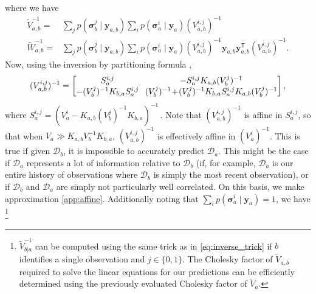 \documentclass{article} %
\newcommand{\deq}{=}
\newcommand{\given}{\!\ensuremath{\mid}\!}
\newcommand{\cm}[1]{\ensuremath{\mathcal{#1}}}
\newcommand{\bm}[1]{\ensuremath{\mathbf{#1}}}
\newcommand{\data}{\ensuremath{\cm{D}}}
\newcommand{\vect}[1]{\bm{#1}}
\newcommand{\vy}{\vect{y}}
\newcommand{\vs}{\vect{\sigma}}
\newcommand{\amean}[2]{\tilde{{m}}(#1 \given #2 )}
\newcommand{\acov}[2]{\tilde{{C}}(#1 \given #2 )}
\newcommand{\fPr}{p}
\newcommand{\Prob}[2]{\fPr(#1 \given #2 )}
\newcommand{\st}{_{\star}}
\newcommand{\tr}{\ensuremath{\mathsf{T}}}
\begin{document}
where we have
\begin{align*}
\tilde{V}^{-1}_{a,b} \deq {} &
\sum_{j} \Prob{\vs^j_{b}}{\vy_{a,b}}\sum_i \Prob{\vs^i_{a}}{\vy_{a}} (V_{a,b}^{i,j})^{-1} \\
\tilde{W}^{-1}_{a,b} \deq {} &
\sum_{j} \Prob{\vs^j_{b}}{\vy_{a,b}}\sum_i \Prob{\vs^i_{a}}{\vy_{a}} (V_{a,b}^{i,j})^{-1}  
 \vy_{a,b}^{\phantom{\tr}} \vy_{a,b}^\tr (V_{a,b}^{i,j})^{-1}.
\end{align*}
Now, using the inversion by partitioning formula \citep[Section 2.7]
{NumericalRecipes},
\begin{align*}
({V}^{i,j}_{a,b})^{-1} =
\begin{bmatrix}
 S^{i,j}_a &\hspace{-0.1cm} -S^{i,j}_a K_{a,b} (V^j_b)^{-1} \\
 - (V^j_b)^{-1} K_{b,a} S^{i,j}_a &\hspace{-0.1cm} (V^j_b)^{-1}\!+\!(V^j_b)^{-1} K_{b,a} S^{i,j}_a K_{a,b} (V^j_b)^{-1} 
\end{bmatrix},
\end{align*}
where
$
S^{i,j}_a \deq (V^i_a -K_{a,b} (V^j_b)^{-1}K_{b,a})^{-1}\,.
$ Note that $({V}^{i,j}_{a,b})^{-1}$ is affine in $S^{i,j}_a$, so that when $V_a \gg K_{a,b} V_b^{-1} K_{b,a}$,
$({V}^{i,j}_{a,b})^{-1}$ is effectively affine in $(V^i_a)^{-1}$. This
is true if given $\data_b$, it is impossible to accurately predict
$\data_a$. This might be the case if $\data_a$ represents a lot of
information relative to $\data_b$ (if, for example, $\data_a$ is our
entire history of observations where $\data_b$ is simply the most
recent observation), or if $\data_b$ and $\data_a$ are simply not
particularly well correlated. On this basis, we make approximation \ref{app:affine}. Additionally noting that $\sum_i \Prob{\vs^i_{a}}{\vy_{a}} = 1$, we have
\footnote{
$\tilde{V}^{-1}_{b|a}$ can be computed using the same trick as in \eqref{eq:inverse_trick} if
$b$ identifies a single observation and $j\in\{0,1\}$. The Cholesky factor of $\tilde{V}_{a,b}$ required to solve the linear equations for our predictions can be efficiently determined \citep[Appendix
  B]{osbornebayesian} using the previously evaluated Cholesky factor of $\tilde{V}_{a}$.
}
\end{document}
